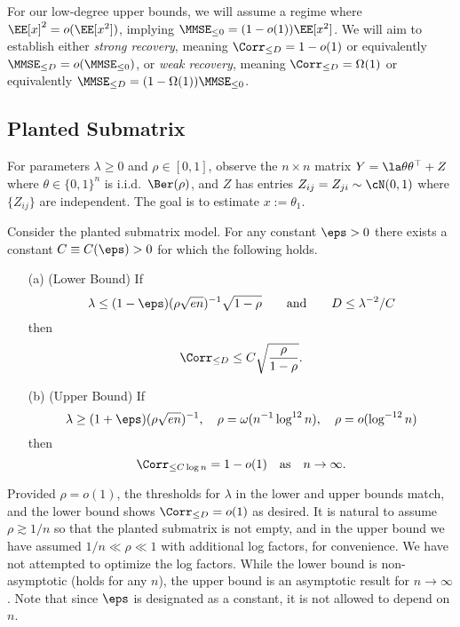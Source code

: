 \documentclass[11pt]{article}
\begin{document}
For our low-degree upper bounds, we will assume a regime where $\EE[x]^2=o(\EE[x^2])$, implying $\MMSE_{\le 0} = (1-o(1)) \EE[x^2]$. We will aim to establish either \emph{strong recovery}, meaning $\Corr_{\le D} = 1-o(1)$ or equivalently $\MMSE_{\le D} = o(\MMSE_{\le 0})$, or \emph{weak recovery}, meaning $\Corr_{\le D} = \Omega(1)$ or equivalently $\MMSE_{\le D} = (1-\Omega(1)) \MMSE_{\le 0}$.



\subsection{Planted Submatrix}
\label{sec:main-subm}

\begin{definition}
For parameters $\lambda \ge 0$ and $\rho \in [0,1]$, observe the $n\times n$ matrix $Y=\la \theta \theta^{\top}+Z$ where $\theta\in \{0,1\}^n$ is i.i.d.\ $\Ber(\rho)$, and $Z$ has entries $Z_{ij}=Z_{ji}\sim\cN(0,1)$ where $\{Z_{ij}\}$ are independent. The goal is to estimate $x := \theta_1$.
\end{definition}

\begin{theorem}\label{thm:main-subm}
Consider the planted submatrix model. For any constant $\eps > 0$ there exists a constant $C \equiv C(\eps) > 0$ for which the following holds.
\begin{enumerate}
\item[(a)] (Lower Bound) If
\[ \lambda \le (1-\eps)(\rho\sqrt{en})^{-1}\sqrt{1-\rho} \qquad \text{and} \qquad D \le \lambda^{-2}/C \]
then
\[ \Corr_{\le D} \le C \sqrt{\frac{\rho}{1-\rho}}. \]
\item[(b)] (Upper Bound) If
\[ \lambda \ge (1+\eps)(\rho\sqrt{en})^{-1}, \quad \rho = \omega(n^{-1} \log^{12} n), \quad \rho = o(\log^{-12} n) \]
then
\[ \Corr_{\le C \log n} = 1-o(1) \quad \text{as} \quad n \to \infty. \]
\end{enumerate}
\end{theorem}

Provided $\rho = o(1)$, the thresholds for $\lambda$ in the lower and upper bounds match, and the lower bound shows $\Corr_{\le D} = o(1)$ as desired. It is natural to assume $\rho \gtrsim 1/n$ so that the planted submatrix is not empty, and in the upper bound we have assumed $1/n \ll \rho \ll 1$ with additional log factors, for convenience. We have not attempted to optimize the log factors. While the lower bound is non-asymptotic (holds for any $n$), the upper bound is an asymptotic result for $n \to \infty$. Note that since $\eps$ is designated as a constant, it is not allowed to depend on $n$.
\end{document}
